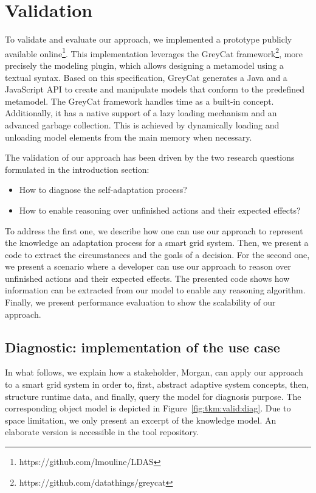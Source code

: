 \section{Validation}
\label{sec:tkm:validation}

To validate and evaluate our approach, we implemented a prototype publicly available online\footnote{https://github.com/lmouline/LDAS}.
This implementation leverages the GreyCat framework\footnote{https://github.com/datathings/greycat}, more precisely the modeling plugin, which allows designing a metamodel using a textual syntax.
Based on this specification, GreyCat generates a Java and a JavaScript API to create and manipulate models that conform to the predefined metamodel.
The GreyCat framework handles time as a built-in concept.
Additionally, it has a native support of a lazy loading mechanism and an advanced garbage collection.
This is achieved by dynamically loading and unloading model elements from the main memory when necessary.

The validation of our approach has been driven by the two research questions formulated in the introduction section:
\begin{itemize}
	\item How to diagnose the self-adaptation process?
	\item How to enable reasoning over unfinished actions and their expected effects?
\end{itemize}

To address the first one, we describe how one can use our approach to represent the knowledge an adaptation process for a smart grid system.
Then, we present a code to extract the circumstances and the goals of a decision.
For the second one, we present a scenario where a developer can use our approach to reason over unfinished actions and their expected effects.
The presented code shows how information can be extracted from our model to enable any reasoning algorithm.
Finally, we present performance evaluation to show the scalability of our approach.

\subsection{Diagnostic: implementation of the use case}
In what follows, we explain how a stakeholder, Morgan, can apply our approach to a smart grid system in order to, first, abstract adaptive system concepts, then, structure runtime data, and finally, query the model for diagnosis purpose.
The corresponding object model is depicted in Figure~\ref{fig:tkm:valid:diag}.
Due to space limitation, we only present an excerpt of the knowledge model.
An elaborate version is accessible in the tool repository.

